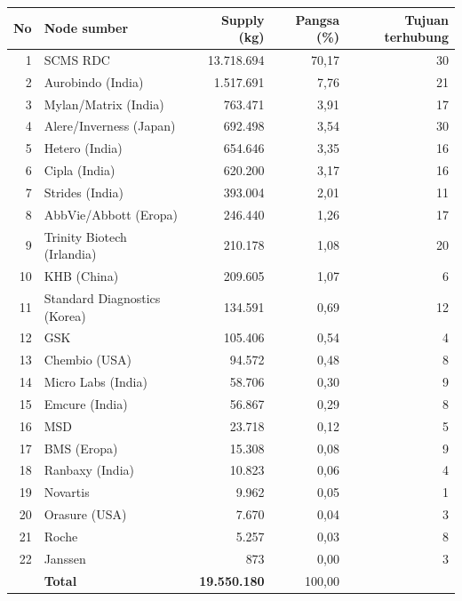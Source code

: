 \begin{tabular}{rlrrr}\toprule No & Node sumber & Supply (kg) & Pangsa (\%) & Tujuan terhubung \\ \midrule
1 & SCMS RDC & 13.718.694 & 70,17 & 30 \\
2 & Aurobindo (India) & 1.517.691 & 7,76 & 21 \\
3 & Mylan/Matrix (India) & 763.471 & 3,91 & 17 \\
4 & Alere/Inverness (Japan) & 692.498 & 3,54 & 30 \\
5 & Hetero (India) & 654.646 & 3,35 & 16 \\
6 & Cipla (India) & 620.200 & 3,17 & 16 \\
7 & Strides (India) & 393.004 & 2,01 & 11 \\
8 & AbbVie/Abbott (Eropa) & 246.440 & 1,26 & 17 \\
9 & Trinity Biotech (Irlandia) & 210.178 & 1,08 & 20 \\
10 & KHB (China) & 209.605 & 1,07 & 6 \\
11 & Standard Diagnostics (Korea) & 134.591 & 0,69 & 12 \\
12 & GSK & 105.406 & 0,54 & 4 \\
13 & Chembio (USA) & 94.572 & 0,48 & 8 \\
14 & Micro Labs (India) & 58.706 & 0,30 & 9 \\
15 & Emcure (India) & 56.867 & 0,29 & 8 \\
16 & MSD & 23.718 & 0,12 & 5 \\
17 & BMS (Eropa) & 15.308 & 0,08 & 9 \\
18 & Ranbaxy (India) & 10.823 & 0,06 & 4 \\
19 & Novartis & 9.962 & 0,05 & 1 \\
20 & Orasure (USA) & 7.670 & 0,04 & 3 \\
21 & Roche & 5.257 & 0,03 & 8 \\
22 & Janssen & 873 & 0,00 & 3 \\
\midrule & \textbf{Total} & \textbf{19.550.180} & 100,00 & \\ \bottomrule\end{tabular}
